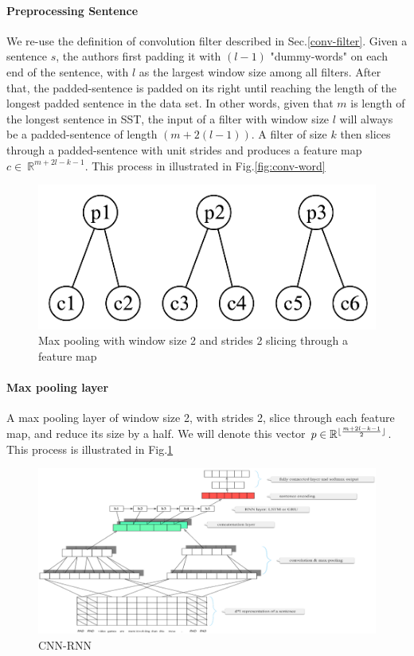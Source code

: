 \paragraph{Preprocessing Sentence} We re-use the definition of convolution filter described in Sec.\ref{conv-filter}.
Given a sentence \(s\), the authors first padding it with \((l-1)\) "dummy-words" on each end of the sentence, with \(l\) as the largest window size among all filters.
After that, the padded-sentence is padded on its right until reaching the length of the longest padded sentence in the data set.
In other words, given that \(m\) is length of the longest sentence in SST, the input of a filter with window size \(l\) will always be a padded-sentence of length \((m + 2(l-1))\).
A filter of size \(k\) then slices through a padded-sentence with unit strides and produces a feature map \(c \in \ \mathbb{R}^{m + 2l - k - 1}\).
This process in illustrated in Fig.\ref{fig:conv-word}

\begin{figure}[H]
    \centering    \includegraphics[scale=0.34]{figure/2-max}
    \caption[Max pooling policy]{Max pooling with window size 2 and strides 2 slicing through a feature map}
    \label{fig:2-max-pooling}
\end{figure}

\paragraph{Max pooling layer} A max pooling layer of window size 2, with strides 2, slice through each feature map, and reduce its size by a half.
We will denote this vector \(p \in \mathbb{R}^{\lfloor \frac{m + 2l - k - 1}{2} \rfloor} \).
This process is illustrated in Fig.\ref{fig:2-max-pooling}


\begin{figure}[H]
    \raggedleft    \includegraphics[scale=0.425]{figure/cnn-rnn}
    \caption{CNN-RNN}
    \label{fig:cnn-rnn}
\end{figure}

